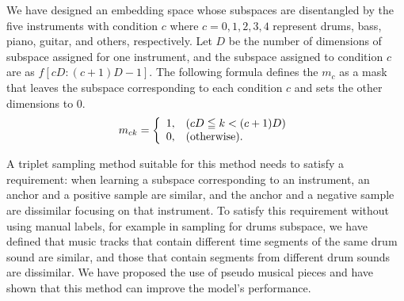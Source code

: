  We have designed an embedding space whose subspaces are disentangled by the five instruments with condition $c$ where $c=0, 1, 2, 3, 4$ represent drums, bass, piano, guitar, and others, respectively. Let $D$ be the number of dimensions of subspace assigned for one instrument, and the subspace assigned to condition $c$ are as $f[cD:(c+1)D-1]$. The following formula defines the $m_c$ as a mask that leaves the subspace corresponding to each condition $c$ and sets the other dimensions to 0. 
\begin {align}
m_{ck} = \left\{
\begin{array}{ll}
1, & (cD\leqq k<(c+1)D)\\
0, & (\mbox{otherwise}).
\end{array}
\right.
\vspace{-8pt}
\end{align}

A triplet sampling method suitable for this method needs to satisfy a requirement: when learning a subspace corresponding to an instrument, an anchor and a positive sample are similar, and the anchor and a negative sample are dissimilar focusing on that instrument. To satisfy this requirement without using manual labels, for example in sampling for drums subspace, we have defined that music tracks that contain different time segments of the same drum sound are similar, and those that contain segments from different drum sounds are dissimilar. We have proposed the use of pseudo musical pieces and have shown that this method can improve the model’s performance.